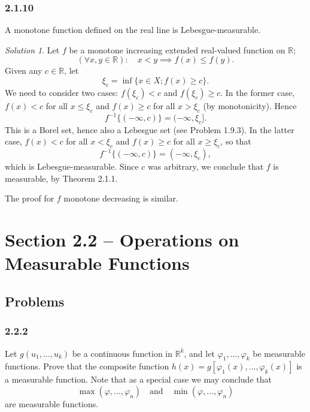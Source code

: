 \documentclass{report}
\newcommand{\bb}[1]{\mathbb{#1}}
\theoremstyle{remark}
\newtheorem*{solution}{Solution}
\begin{document}
\subsubsection*{2.1.10}
A monotone function defined on the real line is Lebesgue-measurable.

\begin{solution}
  Let $f$ be a monotone increasing extended real-valued function on $\bb R$;
  \begin{equation*}
    (\forall x,y \in \bb R): \quad x < y \implies f(x) \le f(y).
  \end{equation*}
  Given any $c \in \bb R$, let
  \begin{equation*}
    \xi_c = \inf \{x \in X; f(x) \ge c\}.
  \end{equation*}
  We need to consider two cases: $f(\xi_c) < c$ and $f(\xi_c) \ge c$. In the former case, $f(x) < c$ for all $x \le \xi_c$ and $f(x) \ge c$ for all $x > \xi_c$ (by monotonicity). Hence
  \begin{equation*}
    f^{-1}\{(-\infty,c)\} = (-\infty, \xi_c].
  \end{equation*}
  This is a Borel set, hence also a Lebesgue set (see Problem 1.9.3). In the latter case, $f(x) < c$ for all $x < \xi_c$ and $f(x) \ge c$ for all $x \ge \xi_c$, so that
  \begin{equation*}
    f^{-1}\{(-\infty,c)\} = (-\infty, \xi_c),
  \end{equation*}
  which is Lebesgue-measurable. Since $c$ was arbitrary, we conclude that $f$ is measurable, by Theorem 2.1.1.

  The proof for $f$ monotone decreasing is similar.
\end{solution}

\section*{Section 2.2 -- Operations on Measurable Functions}

\subsection*{Problems}

\subsubsection*{2.2.2}
Let $g(u_1, \dots, u_k)$ be a continuous function in $\bb R^k$, and let $\varphi_1, \dots, \varphi_k$ be measurable functions. Prove that the composite function $h(x) = g[\varphi_1(x), \dots, \varphi_k(x)]$ is a measurable function. Note that as a special case we may conclude that
\begin{equation*}
  \max(\varphi, \dots, \varphi_n) \quad \text{and} \quad \min(\varphi, \dots, \varphi_n)
\end{equation*}
are measurable functions.
\end{document}
